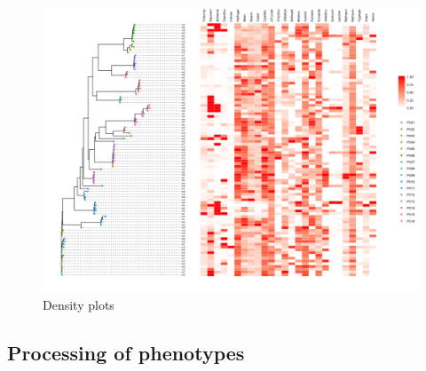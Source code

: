 \documentclass[]{DissertateUSU}
\begin{document}
\begin{figure}

{\centering \includegraphics[height=0.9\textheight]{_static/tree} 

}

\caption{\label{fig:dens}Density plots}\label{fig:unnamed-chunk-6}
\end{figure}

\hypertarget{processing-of-phenotypes}{%
\subsection{Processing of phenotypes}\label{processing-of-phenotypes}}
\end{document}
